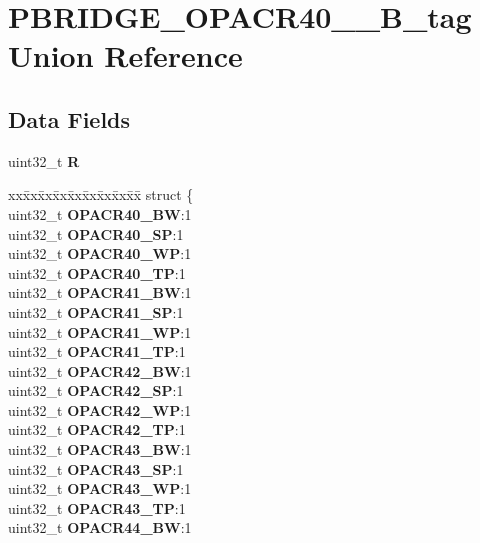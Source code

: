 \hypertarget{unionPBRIDGE__OPACR40__47__32B__tag}{}\section{P\+B\+R\+I\+D\+G\+E\+\_\+\+O\+P\+A\+C\+R40\+\_\+\_\+B\+\_\+tag Union Reference}
\label{unionPBRIDGE__OPACR40__47__32B__tag}
\subsection*{Data Fields}
\begin{DoxyCompactItemize}
\item 
\mbox{\label{unionPBRIDGE__OPACR40__47__32B__tag_a54a20176b45649546d5ff42cc90f5b5e}} 
uint32\+\_\+t {\bfseries R}
\item 
\mbox{\label{unionPBRIDGE__OPACR40__47__32B__tag_a5289df4ed9168b90a26bacdaa1bd7185}} 
\begin{tabbing}
xx\=xx\=xx\=xx\=xx\=xx\=xx\=xx\=xx\=\kill
struct \{\\
\>uint32\_t {\bfseries OPACR40\_BW}:1\\
\>uint32\_t {\bfseries OPACR40\_SP}:1\\
\>uint32\_t {\bfseries OPACR40\_WP}:1\\
\>uint32\_t {\bfseries OPACR40\_TP}:1\\
\>uint32\_t {\bfseries OPACR41\_BW}:1\\
\>uint32\_t {\bfseries OPACR41\_SP}:1\\
\>uint32\_t {\bfseries OPACR41\_WP}:1\\
\>uint32\_t {\bfseries OPACR41\_TP}:1\\
\>uint32\_t {\bfseries OPACR42\_BW}:1\\
\>uint32\_t {\bfseries OPACR42\_SP}:1\\
\>uint32\_t {\bfseries OPACR42\_WP}:1\\
\>uint32\_t {\bfseries OPACR42\_TP}:1\\
\>uint32\_t {\bfseries OPACR43\_BW}:1\\
\>uint32\_t {\bfseries OPACR43\_SP}:1\\
\>uint32\_t {\bfseries OPACR43\_WP}:1\\
\>uint32\_t {\bfseries OPACR43\_TP}:1\\
\>uint32\_t {\bfseries OPACR44\_BW}:1\\

\end{tabbing}
\end{DoxyCompactItemize}
